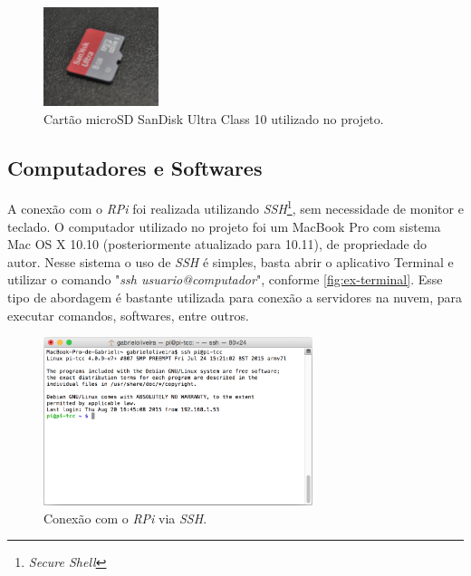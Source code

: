 \documentclass[
		12pt,				%
		openright,			%
		oneside,			%
		a4paper,			%
		chapter=TITLE,		%
		english,			%
		brazil				%
	]{abntex2}
\begin{document}
\begin{figure}[htb]
	\caption{\label{fig:cartaomicrosd}Cartão microSD SanDisk Ultra Class 10 utilizado no projeto.}
	\begin{center}
		\includegraphics[width=0.3\textwidth]{img/cartaomicrosd.jpg}
	\end{center}
\end{figure}

\subsection{Computadores e Softwares}\label{sec:comp-softwares}

A conexão com o \textit{RPi} foi realizada utilizando \textit{SSH}\footnote{\textit{Secure Shell}}, sem necessidade de monitor e teclado. O computador utilizado no projeto foi um MacBook Pro com sistema Mac OS X 10.10 (posteriormente atualizado para 10.11), de propriedade do autor. Nesse sistema o uso de \textit{SSH} é simples, basta abrir o aplicativo Terminal e utilizar o comando "\textit{ssh usuario@computador}", conforme \autoref{fig:ex-terminal}. Esse tipo de abordagem é bastante utilizada para conexão a servidores na nuvem, para executar comandos, softwares, entre outros.

\begin{figure}[htb]
	\caption{\label{fig:ex-terminal}Conexão com o \textit{RPi} via \textit{SSH}.}
	\begin{center}
		\includegraphics[width=0.7\textwidth]{img/terminal-pi.png}
	\end{center}
\end{figure}
\end{document}
